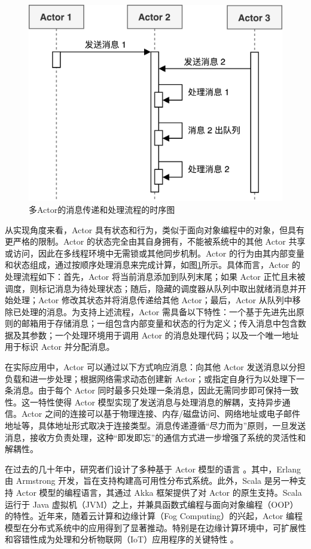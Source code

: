 \begin{figure}[ht]
  \centering
  \includegraphics[width=0.65\linewidth]{pics/2-7actormodel.png}
  \caption{多Actor的消息传递和处理流程的时序图\cite{srirama2021akka}}
  \label{fig:2-7actormodel}
\end{figure} 

从实现角度来看，Actor 具有状态和行为，类似于面向对象编程中的对象，但具有更严格的限制。Actor 的状态完全由其自身拥有，不能被系统中的其他 Actor 共享或访问，因此在多线程环境中无需锁或其他同步机制。Actor 的行为由其内部变量和状态组成，通过按顺序处理消息来完成计算，如图\ref{fig:2-7actormodel}所示。具体而言，Actor 的处理流程如下：首先，Actor 将当前消息添加到队列末尾；如果 Actor 正忙且未被调度，则标记消息为待处理状态；随后，隐藏的调度器从队列中取出就绪消息并开始处理；Actor 修改其状态并将消息传递给其他 Actor；最后，Actor 从队列中移除已处理的消息。为支持上述流程，Actor 需具备以下特性：一个基于先进先出原则的邮箱用于存储消息；一组包含内部变量和状态的行为定义；传入消息中包含数据及其参数；一个处理环境用于调用 Actor 的消息处理代码；以及一个唯一地址用于标识 Actor 并分配消息。

在实际应用中，Actor 可以通过以下方式响应消息：向其他 Actor 发送消息以分担负载和进一步处理；根据网络需求动态创建新 Actor；或指定自身行为以处理下一条消息。由于每个 Actor 同时最多只处理一条消息，因此无需同步即可保持一致性。这一特性使得 Actor 模型实现了发送消息与处理消息的解耦，支持异步通信。Actor 之间的连接可以基于物理连接、内存/磁盘访问、网络地址或电子邮件地址等，具体地址形式取决于连接类型。消息传递遵循“尽力而为”原则，一旦发送消息，接收方负责处理，这种“即发即忘”的通信方式进一步增强了系统的灵活性和解耦性。

在过去的几十年中，研究者们设计了多种基于 Actor 模型的语言 \cite{agha1990concurrent}。其中，Erlang 由 Armstrong 开发，旨在支持构建高可用性分布式系统\cite{armstrong2007history}。此外，Scala 是另一种支持 Actor 模型的编程语言，其通过 Akka 框架提供了对 Actor 的原生支持。Scala 运行于 Java 虚拟机（JVM）之上，并兼具函数式编程与面向对象编程（OOP）的特性。近年来，随着云计算和边缘计算（Fog Computing）的兴起，Actor 编程模型在分布式系统中的应用得到了显著推动。特别是在边缘计算环境中，可扩展性和容错性成为处理和分析物联网（IoT）应用程序的关键特性 \cite{srirama2021akka}。

